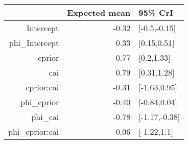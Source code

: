 \begin{tabular}{rrl}
  \hline
 & Expected mean & 95\% CrI \\ 
  \hline
Intercept & -0.32 & [-0.5,-0.15] \\ 
  phi\_Intercept & 0.33 & [0.15,0.51] \\ 
  cprior & 0.77 & [0.2,1.33] \\ 
  cai & 0.79 & [0.31,1.28] \\ 
  cprior:cai & -0.31 & [-1.63,0.95] \\ 
  phi\_cprior & -0.40 & [-0.84,0.04] \\ 
  phi\_cai & -0.78 & [-1.17,-0.38] \\ 
  phi\_cprior:cai & -0.06 & [-1.22,1.1] \\ 
   \hline
\end{tabular}

